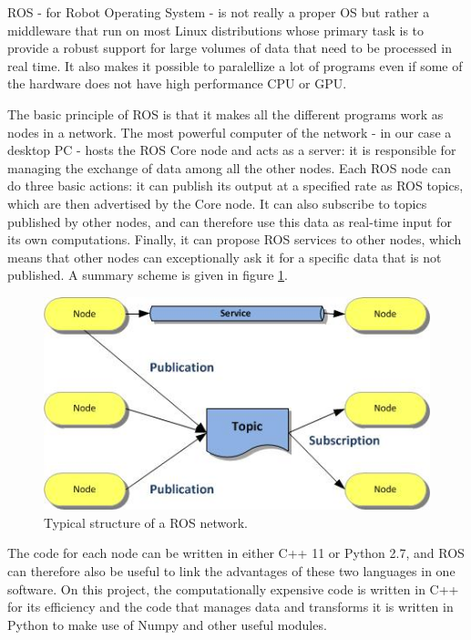 ROS \cite{ROS} - for Robot Operating System - is not really a proper OS but rather a middleware that run on most Linux distributions whose primary task is to provide a robust support for large volumes of data that need to be processed in real time. It also makes it possible to paralellize a lot of programs even if some of the hardware does not have high performance CPU or GPU.

The basic principle of ROS is that it makes all the different programs work as nodes in a network. The most powerful computer of the network - in our case a desktop PC - hosts the ROS Core node and acts as a server: it is responsible for managing the exchange of data among all the other nodes. Each ROS node can do three basic actions: it can publish its output at a specified rate as ROS topics, which are then advertised by the Core node. It can also subscribe to topics published by other nodes, and can therefore use this data as real-time input for its own computations. Finally, it can propose ROS services to other nodes, which means that other nodes can exceptionally ask it for a specific data that is not published. A summary scheme is given in figure \ref{fig:ros_structure}.

\begin{figure}[tp]
\center
\includegraphics[width=120mm, keepaspectratio]{images/ros_structure.png}
\caption{Typical structure of a ROS network.}
\label{fig:ros_structure}
\end{figure}

The code for each node can be written in either C++ 11 or Python 2.7, and ROS can therefore also be useful to link the advantages of these two languages in one software. On this project, the computationally expensive code is written in C++ for its efficiency and the code that manages  data and transforms it is written in Python to make use of Numpy and other useful modules.

